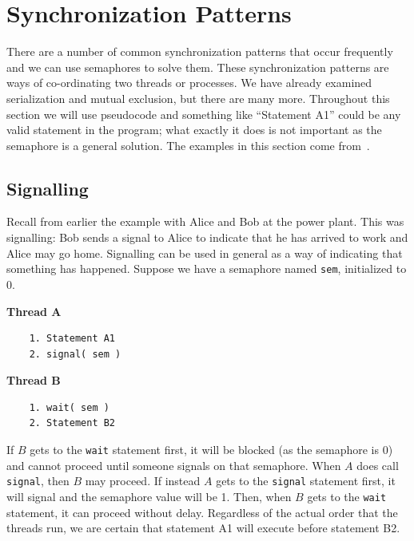 




\section*{Synchronization Patterns}

There are a number of common synchronization patterns that occur frequently and we can use semaphores to solve them. These synchronization patterns are ways of co-ordinating two threads or processes. We have already examined serialization and mutual exclusion, but there are many more. Throughout this section we will use pseudocode and something like ``Statement A1'' could be any valid statement in the program; what exactly it does is not important as the semaphore is a general solution. The examples in this section come from~\cite{lbs}.

\subsection*{Signalling}
Recall from earlier the example with Alice and Bob at the power plant. This was signalling: Bob sends a signal to Alice to indicate that he has arrived to work and Alice may go home. Signalling can be used in general as a way of indicating that something has happened. Suppose we have a semaphore named \texttt{sem}, initialized to 0.

\begin{multicols}{2}
\textbf{Thread A}\vspace{-2em}
  \begin{verbatim}
	1. Statement A1
	2. signal( sem )
  \end{verbatim}
\columnbreak
\textbf{Thread B}\vspace{-2em}
  \begin{verbatim}
	1. wait( sem )
	2. Statement B2
  \end{verbatim}
\end{multicols}
\vspace{-2em}

If $B$ gets to the \texttt{wait} statement first, it will be blocked (as the semaphore is 0) and cannot proceed until someone signals on that semaphore. When $A$ does call \texttt{signal}, then $B$ may proceed. If instead $A$ gets to the \texttt{signal} statement first, it will signal and the semaphore value will be 1. Then, when $B$ gets to the \texttt{wait} statement, it can proceed without delay. Regardless of the actual order that the threads run, we are certain that statement A1 will execute before statement B2.


